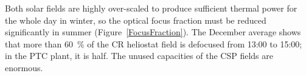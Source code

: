 
Both solar fields are highly over-scaled to produce sufficient thermal power for the whole day in winter, so the optical focus fraction must be reduced significantly in summer (Figure~\ref{FocusFraction}). The December average shows that more than \SI{60}{\percent} of the \ac{CR} heliostat field is defocused from 13:00 to 15:00; in the \ac{PTC} plant, it is half. The unused capacities of the \ac{CSP} fields are enormous. 

